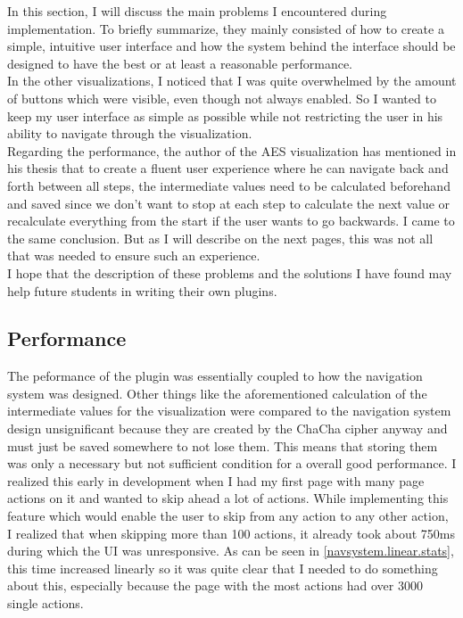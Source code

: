 In this section, I will discuss the main problems I encountered during implementation. To briefly summarize, they mainly consisted of how to create a simple, intuitive user interface and how the system behind the interface should be designed to have the best or at least a reasonable performance. \\ In the other visualizations, I noticed that I was quite overwhelmed by the amount of buttons which were visible, even though not always enabled. So I wanted to keep my user interface as simple as possible while not restricting the user in his ability to navigate through the visualization. \\ Regarding the performance, the author of the AES visualization has mentioned in his thesis that to create a fluent user experience where he can navigate back and forth between all steps, the intermediate values need to be calculated beforehand and saved since we don't want to stop at each step to calculate the next value or recalculate everything from the start if the user wants to go backwards. I came to the same conclusion. But as I will describe on the next pages, this was not all that was needed to ensure such an experience.\\
I hope that the description of these problems and the solutions I have found may help future students in writing their own plugins.

\subsection{Performance}

The peformance of the plugin was essentially coupled to how the navigation system was designed. Other things like the aforementioned calculation of the intermediate values for the visualization were compared to the navigation system design unsignificant because they are created by the ChaCha cipher anyway and must just be saved somewhere to not lose them. This means that storing them was only a necessary but not sufficient condition for a overall good performance. I realized this early in development when I had my first page with many page actions on it and wanted to skip ahead a lot of actions. While implementing this feature which would enable the user to skip from any action to any other action, I realized that when skipping more than 100 actions, it already took about 750ms during which the UI was unresponsive. As can be seen in \ref{navsystem.linear.stats}, this time increased linearly so it was quite clear that I needed to do something about this, especially because the page with the most actions had over 3000 single actions.

